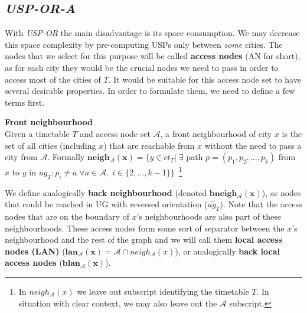 \subsection{\textit{USP-OR-A}}
	    
	With \textit{USP-OR} the main disadvantage is its space consumption. We may decrease this space complexity by pre-computing USPs only between \textit{some} cities. The nodes that we select for this purpose will be called \textbf{access nodes} (AN for short), as for each city they would be the crucial nodes we need to pass in order to access most of the cities of $T$. It would be suitable for this access node set to have several desirable properties. In order to formulate them, we need to define a few terms first.
	
	\begin{definition}
        \textbf{Front neighbourhood} \\
		Given a timetable $T$ and access node set $\mathcal{A}$, a front neighbourhood of city $x$ is the set of all cities (including $x$) that are reachable from $x$ without the need to pass a city from $\mathcal{A}$. Formally $\bm{neigh_{\mathcal{A}}(x)} = \{y \in ct_{T}| \; \exists$ path $p = (p_{1}, p_{2}, ..., p_{k})$ from $x$ to $y$ in $ug_{T}: p_{i} \neq a \; \forall a \in \mathcal{A}, \; i \in \{2, ..., k - 1\} \}$~\footnote{In $neigh_{\mathcal{A}}(x)$ we leave out subscript identifying the timetable $T$. In situation with clear context, we may also leave out the $\mathcal{A}$ subscript.}
    \end{definition}
    
    \noindent We define analogically \textbf{back neighbourhood} (denoted $\bm{bneigh_{\mathcal{A}}(x)}$), as nodes that could be reached in UG with reversed orientation ($\overleftarrow{ug_{T}}$). Note that the access nodes that are on the boundary of $x$'s neighbourhoods are also part of these neighbourhoods. These access nodes form some sort of separator between the $x$'s neighbourhood and the rest of the graph and we will call them \textbf{local access nodes (LAN)} ($\bm{lan_{\mathcal{A}}(x)} = \mathcal{A} \cap neigh_{\mathcal{A}}(x)$), or analogically \textbf{back local access nodes} ($\bm{blan_{\mathcal{A}}(x)}$). \\
    
